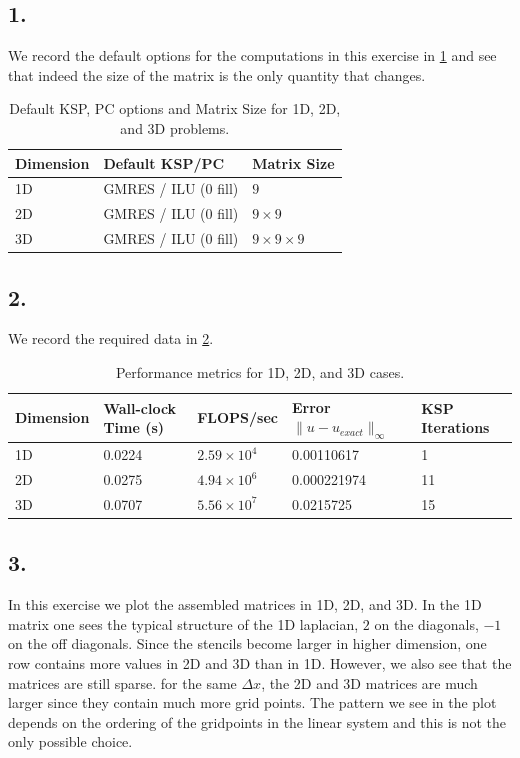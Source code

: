  \subsection*{1.}
 \FloatBarrier
 We record the default options for the computations in this exercise in \cref{Defaults} and see that indeed the size of the matrix is the only quantity that changes.
 \begin{table}[h!]
\centering
\begin{tabular}{|l|l|l|}
\hline
\textbf{Dimension} & \textbf{Default KSP/PC} & \textbf{Matrix Size} \\ \hline
1D & GMRES / ILU (0 fill) & $9$ \\ \hline
2D & GMRES / ILU (0 fill) & $9 \times 9$ \\ \hline
3D & GMRES / ILU (0 fill) & $9 \times 9 \times 9$ \\ \hline
\end{tabular}
\caption{Default KSP, PC options and Matrix Size for 1D, 2D, and 3D problems.}
\label{Defaults}
\end{table}


\FloatBarrier

\subsection*{2.}
\FloatBarrier
We record the required data in \cref{performance}.
\begin{table}[h!]
\centering
\begin{tabular}{|l|l|l|l|l|}
\hline
\textbf{Dimension} & \textbf{Wall-clock Time (s)} & \textbf{FLOPS/sec} & \textbf{Error $\|u-u_{exact}\|_\infty$} & \textbf{KSP Iterations} \\ \hline
1D & 0.0224 & $2.59 \times 10^4$ & 0.00110617 & 1 \\ \hline
2D & 0.0275 & $4.94 \times 10^6$ & 0.000221974 & 11 \\ \hline
3D & 0.0707 & $5.56 \times 10^7$ & 0.0215725 & 15 \\ \hline
\end{tabular}
\caption{Performance metrics for 1D, 2D, and 3D cases.}
\label{performance}
\end{table}


\FloatBarrier

\subsection*{3.}
\FloatBarrier
In this exercise we plot the assembled matrices in 1D, 2D, and 3D. In the 1D matrix one sees the typical structure of the 1D laplacian, $2$ on the diagonals, $-1$ on the off diagonals. Since the stencils become larger in higher dimension, one row contains more values in 2D and 3D than in 1D. However, we also see that the matrices are still sparse. for the same $\Delta x$, the 2D and 3D matrices are much larger since they contain much more grid points. The pattern we see in the plot depends on the ordering of the gridpoints in the linear system and this is not the only possible choice.

